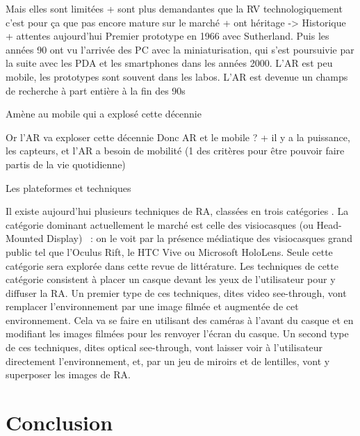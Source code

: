 
Mais elles sont limitées + sont plus demandantes que la RV technologiquement c'est pour ça que pas encore mature sur le marché + ont héritage -> Historique + attentes aujourd'hui
Premier prototype en 1966 avec Sutherland. Puis les années 90 ont vu l'arrivée des PC avec la miniaturisation, qui s'est poursuivie par la suite avec les PDA et les smartphones dans les années 2000. L'AR est peu mobile, les prototypes sont souvent dans les labos. L'AR est devenue un champs de recherche à part entière à la fin des 90s

Amène au mobile qui a explosé cette décennie

Or l'AR va exploser cette décennie
Donc AR et le mobile ? + il y a la puissance, les capteurs, et l'AR a besoin de mobilité (1 des critères pour être pouvoir faire partis de la vie quotidienne) \citep{VanKrevelenPoelman2010}


Les plateformes et techniques

Il existe aujourd'hui plusieurs techniques de RA, classées en trois catégories . La catégorie dominant actuellement le marché est celle des visiocasques (ou \foreignlanguage{english}{Head-Mounted Display}) \citep{VanKrevelenPoelman2010}~: on le voit par la présence médiatique des visiocasques grand public tel que l'Oculus Rift, le HTC Vive ou Microsoft HoloLens. Seule cette catégorie sera explorée dans cette revue de littérature. Les techniques de cette catégorie consistent à placer un casque devant les yeux de l'utilisateur pour y diffuser la RA. Un premier type de ces techniques, dites \foreignlanguage{english}{video see-through}, vont remplacer l'environnement par une image filmée et augmentée de cet environnement. Cela va se faire en utilisant des caméras à l'avant du casque et en modifiant les images filmées pour les renvoyer l'écran du casque. Un second type de ces techniques, dites \foreignlanguage{english}{optical see-through}, vont laisser voir à l'utilisateur directement l'environnement, et, par un jeu de miroirs et de lentilles, vont y superposer les images de RA.


\section*{Conclusion}
